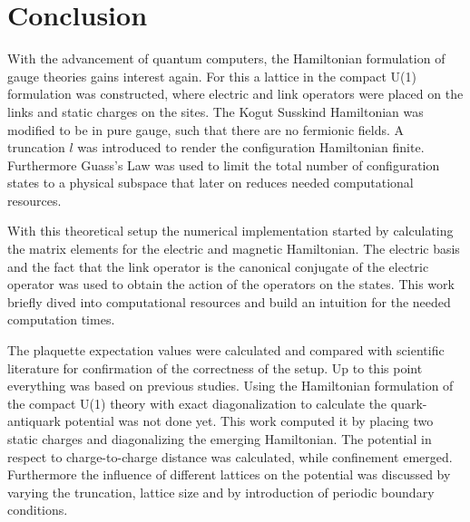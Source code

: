 \section{Conclusion}
With the advancement of quantum computers, the Hamiltonian formulation of gauge theories gains interest again. For this a lattice in the compact U(1) formulation was constructed, where electric and link operators were placed on the links and static charges on the sites. The Kogut Susskind Hamiltonian was modified to be in pure gauge, such that there are no fermionic fields. A truncation $l$ was introduced to render the configuration Hamiltonian finite. Furthermore Guass's Law was used to limit the total number of configuration states to a physical subspace that later on reduces needed computational resources.

With this theoretical setup the numerical implementation started by calculating the matrix elements for the electric and magnetic Hamiltonian. The electric basis and the fact that the link operator is the canonical conjugate of the electric operator was used to obtain the action of the operators on the states. This work briefly dived into computational resources and build an intuition for the needed computation times.

The plaquette expectation values were calculated and compared with scientific literature for confirmation of the correctness of the setup. Up to this point everything was based on previous studies. Using the Hamiltonian formulation of the compact U(1) theory with exact diagonalization to calculate the quark-antiquark potential was not done yet. This work computed it by placing two static charges and diagonalizing the emerging Hamiltonian. The potential in respect to charge-to-charge distance was calculated, while confinement emerged. Furthermore the influence of different lattices on the potential was discussed by varying the truncation, lattice size and by introduction of periodic boundary conditions.

